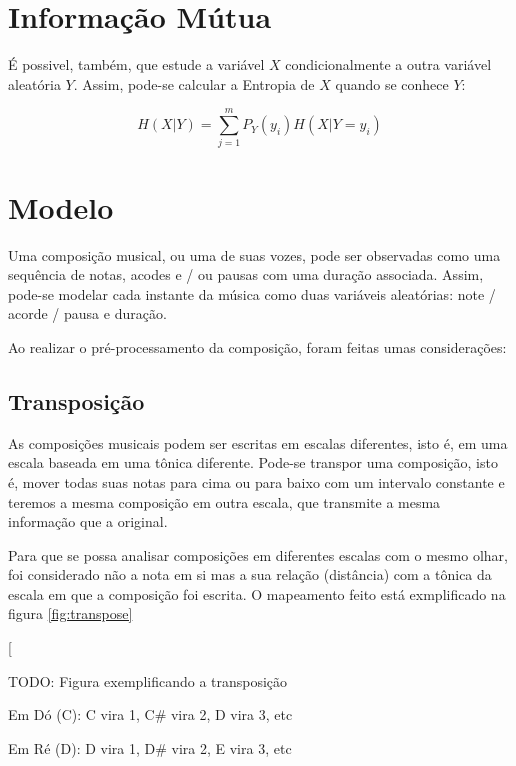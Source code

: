 \section{Informação Mútua}

É possivel, também, que estude a variável $X$ condicionalmente a outra variável aleatória $Y$. Assim, pode-se calcular a Entropia de $X$ quando se conhece $Y$:

\begin{equation}
    H(X|Y) =  \sum_{j=1}^{m} P_Y(y_i) H(X|Y = y_i)
\end{equation}


\section{Modelo}

Uma composição musical, ou uma de suas vozes, pode ser observadas como uma sequência de notas, acodes e / ou pausas com uma duração associada. Assim, pode-se modelar cada instante da música como duas variáveis aleatórias: note / acorde / pausa e duração.

Ao realizar o pré-processamento da composição, foram feitas umas considerações:


\subsection{Transposição}

As composições musicais podem ser escritas em escalas diferentes, isto é, em uma escala baseada em uma tônica diferente. Pode-se transpor uma composição, isto é, mover todas suas notas para cima ou para baixo com um intervalo constante e teremos a mesma composição em outra escala, que transmite a mesma informação que a original.

Para que se possa analisar composições em diferentes escalas com o mesmo olhar, foi considerado não a nota em si mas a sua relação (distância) com a tônica da escala em que a composição foi escrita. O mapeamento feito está exmplificado na figura \ref{fig:transpose}

[

TODO: Figura exemplificando a transposição

Em Dó (C): C vira 1, C\# vira 2, D vira 3, etc

Em Ré (D): D vira 1, D\# vira 2, E vira 3, etc

